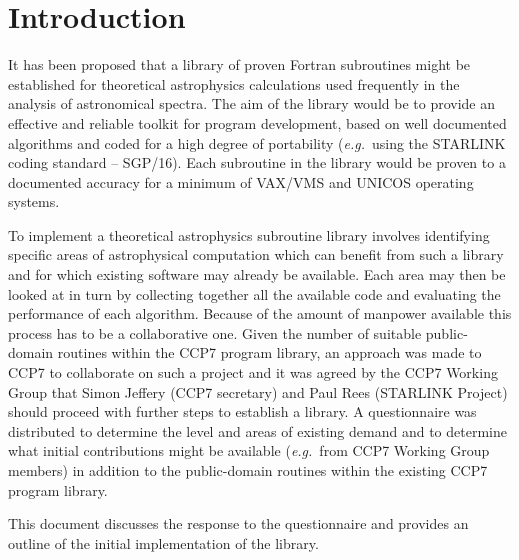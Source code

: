 \begin {abstract}
It is proposed that a well-documented subroutine library be written in the area
of theoretical astrophysics. 
A questionnaire has been circulated to the UK astronomical community.
The response indicated interest in a library of subroutines mainly covering 
the area of astronomical spectroscopy.
A preliminary discussion is presented of the intended contents of the 
library, in terms of its functionality, design and documentation.
Targets for the development of the initial version of the library are given.
Comments are invited.
\end {abstract}

\section {Introduction}

It has been proposed that a library of proven Fortran subroutines might be
established for theoretical astrophysics calculations used frequently in the
analysis of astronomical spectra.
The aim of the library would be to provide an effective and reliable toolkit for
program development, based on well documented algorithms and coded for a
high degree of portability ({\em e.g.}\ using the STARLINK coding standard --
SGP/16).
Each subroutine in the library would be proven to a documented accuracy for
a minimum of VAX/VMS and UNICOS operating systems.

To implement a theoretical astrophysics subroutine library involves identifying 
specific areas of astrophysical computation which can benefit from such a 
library and for which existing software may already be available.
Each area may then be looked at in turn by collecting together all the available
code and evaluating the performance of each algorithm.
Because of the amount of manpower available this process has to be a
collaborative one.
Given the number of suitable public-domain routines within the CCP7
program library, an approach was made to CCP7 to collaborate on
such a project and it was agreed by the CCP7 Working Group that Simon
Jeffery (CCP7 secretary) and Paul Rees (STARLINK Project) should proceed
with further steps to establish a library.
A questionnaire was distributed to determine the level and areas of existing
demand and to determine what initial contributions might be available
({\em e.g.}\ from CCP7 Working Group members) in addition to the public-domain
routines within the existing CCP7 program library.

This document discusses the response to the questionnaire and provides an
outline of the initial implementation of the library.


